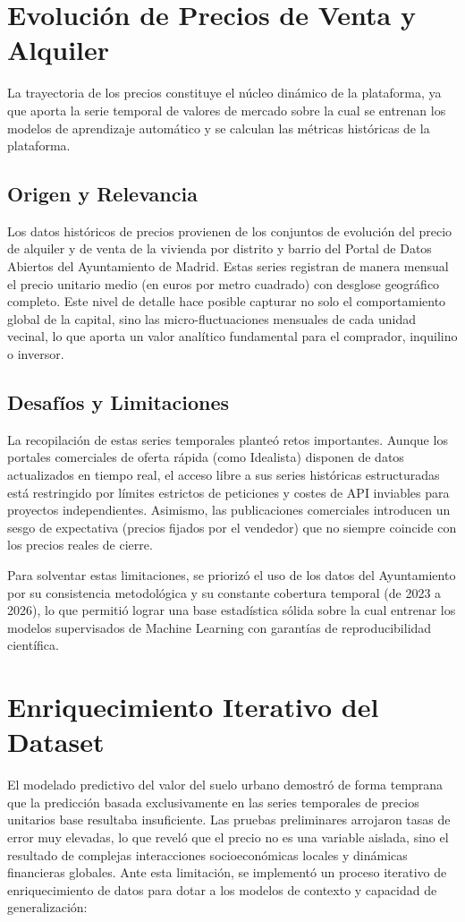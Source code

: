 \documentclass[a4paper,11pt,openany]{book}
\begin{document}
\section{Evolución de Precios de Venta y Alquiler}
La trayectoria de los precios constituye el núcleo dinámico de la plataforma, ya que aporta la serie temporal de valores de mercado sobre la cual se entrenan los modelos de aprendizaje automático y se calculan las métricas históricas de la plataforma.

\subsection{Origen y Relevancia}
Los datos históricos de precios provienen de los conjuntos de evolución del precio de alquiler y de venta de la vivienda por distrito y barrio del Portal de Datos Abiertos del Ayuntamiento de Madrid. Estas series registran de manera mensual el precio unitario medio (en euros por metro cuadrado) con desglose geográfico completo. Este nivel de detalle hace posible capturar no solo el comportamiento global de la capital, sino las micro-fluctuaciones mensuales de cada unidad vecinal, lo que aporta un valor analítico fundamental para el comprador, inquilino o inversor.

\subsection{Desafíos y Limitaciones}
La recopilación de estas series temporales planteó retos importantes. Aunque los portales comerciales de oferta rápida (como Idealista) disponen de datos actualizados en tiempo real, el acceso libre a sus series históricas estructuradas está restringido por límites estrictos de peticiones y costes de API inviables para proyectos independientes. Asimismo, las publicaciones comerciales introducen un sesgo de expectativa (precios fijados por el vendedor) que no siempre coincide con los precios reales de cierre. 

Para solventar estas limitaciones, se priorizó el uso de los datos del Ayuntamiento por su consistencia metodológica y su constante cobertura temporal (de 2023 a 2026), lo que permitió lograr una base estadística sólida sobre la cual entrenar los modelos supervisados de Machine Learning con garantías de reproducibilidad científica.

\section{Enriquecimiento Iterativo del Dataset}\label{sec:enriquecimiento}
El modelado predictivo del valor del suelo urbano demostró de forma temprana que la predicción basada exclusivamente en las series temporales de precios unitarios base resultaba insuficiente. Las pruebas preliminares arrojaron tasas de error muy elevadas, lo que reveló que el precio no es una variable aislada, sino el resultado de complejas interacciones socioeconómicas locales y dinámicas financieras globales. Ante esta limitación, se implementó un proceso iterativo de enriquecimiento de datos para dotar a los modelos de contexto y capacidad de generalización:
\end{document}
